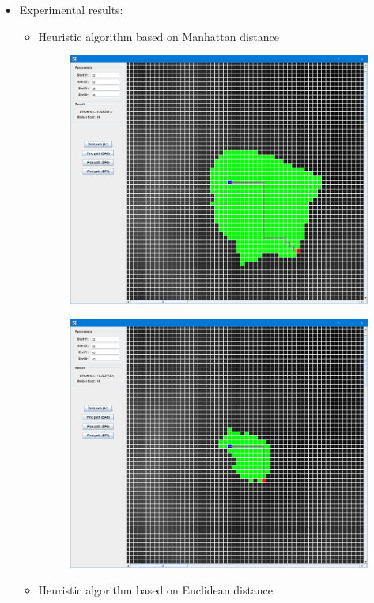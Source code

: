 \documentclass[
]{article}
\begin{document}
\begin{itemize}
  \begin{itemize}
  \item
    Experimental results:

    \begin{itemize}
    \item
      Heuristic algorithm based on Manhattan distance

      \begin{figure}
      \centering
      \includegraphics{./images/image-20210523082345704.png}
      \caption{}
      \end{figure}

      \begin{figure}
      \centering
      \includegraphics{./images/image-20210523082417053.png}
      \caption{}
      \end{figure}
    \item
      Heuristic algorithm based on Euclidean distance


\end{itemize}
\end{itemize}
\end{itemize}
\end{document}
